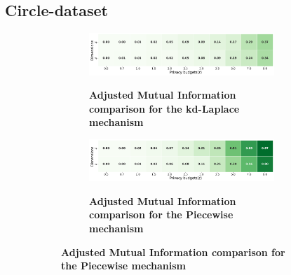 \subsection{Circle-dataset}
\begin{figure}[H]
    \centering
    \begin{subfigure}[b]{0.85\textwidth}
        \begin{subfigure}[c]{1\textwidth}
            \caption{\textbf{Adjusted Mutual Information comparison for the kd-Laplace mechanism}}
            \includegraphics[width=1\textwidth]{Results/kd-laplace/kd-Laplace/circle-dataset/ami.png}
            \label{fig:ami_circle-dataset_comparison_kdlaplace_2d}
        \end{subfigure}
        \vfill %
        \begin{subfigure}[c]{1\textwidth}
            \caption{\textbf{Adjusted Mutual Information comparison for the Piecewise mechanism}}
            \includegraphics[width=1\textwidth]{Results/kd-laplace/piecewise/circle-dataset/ami.png}
            \label{fig:ami_circle-dataset_comparison_piecewise_2d}
        \end{subfigure}
    \end{subfigure}
    \hfill %
    \begin{subfigure}[b]{0.075\textwidth}

\end{subfigure}
\end{figure}
